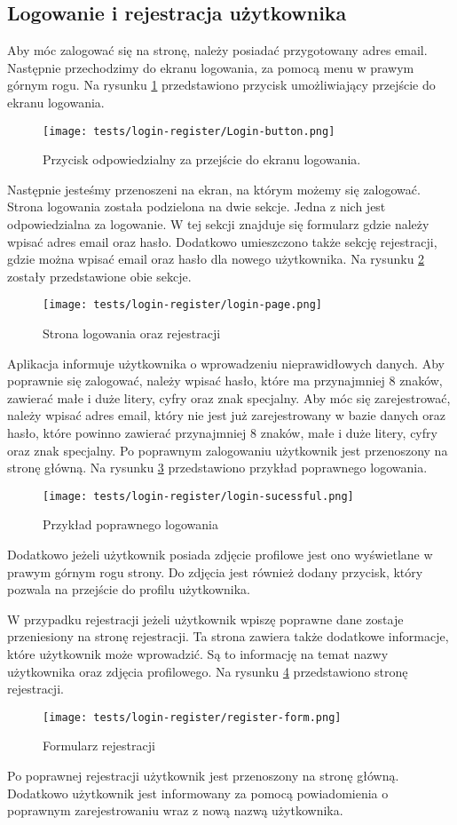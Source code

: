 \subsection{Logowanie i rejestracja użytkownika}
Aby móc zalogować się na stronę, należy posiadać przygotowany adres email. Następnie przechodzimy do ekranu logowania, za pomocą menu w prawym górnym rogu. Na rysunku \ref{login_menu} przedstawiono przycisk umożliwiający przejście do ekranu logowania.
\begin{figure}[H]
  \centering
  \texttt{[image: tests/login-register/Login-button.png]}
  \caption{Przycisk odpowiedzialny za przejście do ekranu logowania.}
  \label{login_menu}
\end{figure}
Następnie jesteśmy przenoszeni na ekran, na którym możemy się zalogować. Strona logowania została podzielona na dwie sekcje. Jedna z nich jest odpowiedzialna za logowanie. W tej sekcji znajduje się formularz gdzie należy wpisać adres email oraz hasło. Dodatkowo umieszczono także sekcję rejestracji, gdzie można wpisać email oraz hasło dla nowego użytkownika. Na rysunku \ref{login_page} zostały przedstawione obie sekcje.
\begin{figure}[H]
  \centering
  \texttt{[image: tests/login-register/login-page.png]}
  \caption{Strona logowania oraz rejestracji}
  \label{login_page}
\end{figure}
Aplikacja informuje użytkownika o wprowadzeniu nieprawidłowych danych. Aby poprawnie się zalogować, należy wpisać hasło, które ma przynajmniej 8 znaków, zawierać małe i duże litery, cyfry oraz znak specjalny. Aby móc się zarejestrować, należy wpisać adres email, który nie jest już zarejestrowany w bazie danych oraz hasło, które powinno zawierać przynajmniej 8 znaków, małe i duże litery, cyfry oraz znak specjalny.  Po poprawnym zalogowaniu użytkownik jest przenoszony na stronę główną. Na rysunku \ref{login_success} przedstawiono przykład poprawnego logowania. 
\begin{figure}[H]
  \centering
  \texttt{[image: tests/login-register/login-sucessful.png]}
  \caption{Przykład poprawnego logowania}
  \label{login_success}
\end{figure}
Dodatkowo jeżeli użytkownik posiada zdjęcie profilowe jest ono wyświetlane w prawym górnym rogu strony. Do zdjęcia jest również dodany przycisk, który pozwala na przejście do profilu użytkownika.

W przypadku rejestracji jeżeli użytkownik wpiszę poprawne dane zostaje przeniesiony na stronę rejestracji. Ta strona zawiera także dodatkowe informacje, które użytkownik może wprowadzić. Są to informację na temat nazwy użytkownika oraz zdjęcia profilowego. Na rysunku \ref{register_page} przedstawiono stronę rejestracji.
\begin{figure}[H]
  \centering
  \texttt{[image: tests/login-register/register-form.png]}
  \caption{Formularz rejestracji}
  \label{register_page}
\end{figure}
Po poprawnej rejestracji użytkownik jest przenoszony na stronę główną. Dodatkowo użytkownik jest informowany za pomocą powiadomienia o poprawnym zarejestrowaniu wraz z nową nazwą użytkownika. 

